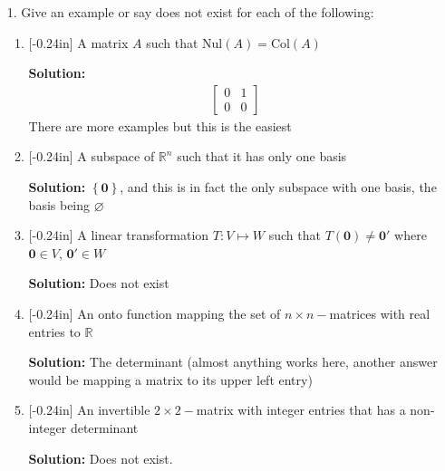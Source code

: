 \documentclass[letterpaper,12pt]{article}
\newcommand{\set}[1]{\left\{ #1 \right\}}
\theoremstyle{definition}
\begin{document}
\begin{enumerate}
    \item[1.]  Give an example or say does not exist for each of the following: \begin{enumerate}
        \item\reversemarginpar{}[-0.24in] A matrix $A$ such that $\mathrm{Nul}(A) = \mathrm{Col}(A)$
        \begin{mdframed}
            \textbf{Solution:}
            \begin{align*}
                \begin{bmatrix}
                    0 & 1 \\ 0 & 0
                \end{bmatrix}
            \end{align*}
        There are more examples but this is the easiest
        \end{mdframed}
        \item\reversemarginpar{}[-0.24in] A subspace of $\mathbb{R}^n$ such that it has only one basis
        \begin{mdframed}
            \textbf{Solution:}
            $\set{\mathbf{0}}$, and this is in fact the only subspace with one basis, the basis being $\varnothing$
        \end{mdframed}
        \item\reversemarginpar{}[-0.24in] A linear transformation $T: V \mapsto W$ such that $T(\mathbf{0}) \neq \mathbf{0}'$ where $\mathbf{0} \in V$, $\mathbf{0}' \in W$
        \begin{mdframed}
            \textbf{Solution:}
            Does not exist
        \end{mdframed}
        \item\reversemarginpar{}[-0.24in] An onto function mapping the set of $n\times n-$matrices with real entries to $\mathbb{R}$
        \begin{mdframed}
            \textbf{Solution:}
            The determinant (almost anything works here, another answer would be mapping a matrix to its upper left entry)
        \end{mdframed}
        \item\reversemarginpar{}[-0.24in] An invertible $2\times2-$matrix with integer entries that has a non-integer determinant 
        \begin{mdframed}
            \textbf{Solution:}
            Does not exist.
        \end{mdframed}
    \end{enumerate}
\end{enumerate}
\end{document}
